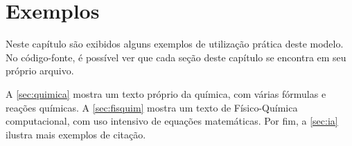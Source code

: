 \chapter{Exemplos} \label{part:exemplos}

Neste capítulo são exibidos alguns exemplos de utilização prática deste modelo. No código-fonte, é possível ver que cada seção deste capítulo se encontra em seu próprio arquivo.

A \autoref{sec:quimica} mostra um texto próprio da química, com várias fórmulas e reações químicas.
A \autoref{sec:fisquim} mostra um texto de Físico-Química computacional, com uso intensivo de equações matemáticas.
Por fim, a \autoref{sec:ia} ilustra mais exemplos de citação.







